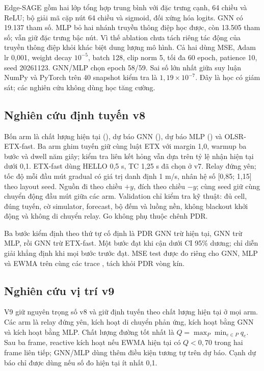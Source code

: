 Edge-SAGE gồm hai lớp tổng hợp trung bình với đặc trưng cạnh, 64 chiều và
ReLU; bộ giải mã cặp nút 64 chiều và sigmoid, đối xứng hóa logits. GNN có
19.137 tham số. MLP bỏ hai nhánh truyền thông điệp học được, còn 13.505 tham
số; vẫn giữ đặc trưng bậc nút. Vì thế ablation chưa tách riêng tác động của
truyền thông điệp khỏi khác biệt dung lượng mô hình. Cả hai dùng MSE, Adam
lr 0,001, weight decay $10^{-5}$, batch 128, clip norm 5, tối đa 60 epoch,
patience 10, seed 20261123. GNN/MLP chọn epoch 58/59. Sai số lớn nhất giữa
suy luận NumPy và PyTorch trên 40 snapshot kiểm tra là $1{,}19\times10^{-7}$.
Đây là học có giám sát; các nghiên cứu không dùng học tăng cường.

\subsection{Nghiên cứu định tuyến v8}\label{sub:v8}
Bốn arm là chất lượng hiện tại (), dự báo GNN
(), dự báo MLP () và OLSR-ETX-fast.
Ba arm ghim tuyến giữ cùng luật ETX với margin 1,0, warmup ba bước và dwell
năm giây; kiểm tra liên kết hỏng vẫn dựa trên tỷ lệ nhận hiện tại dưới 0,1.
ETX-fast dùng HELLO 0,5 s, TC 1,25 s đã chọn ở v7. Relay đứng yên; tốc độ
mỗi đầu mút gradual có giá trị danh định 1 m/s, nhân hệ số [0,85; 1,15] theo
layout seed. Nguồn đi theo chiều $+y$, đích theo chiều $-y$; cùng seed giữ
cùng chuyển động đầu mút giữa các arm. Validation chỉ kiểm tra kỹ thuật: đủ cell,
đúng tuyến, cờ simulator, forecast, bộ đếm và luồng nền, không blackout khởi
động và không di chuyển relay. Go không phụ thuộc chênh PDR.

Ba bước kiểm định theo thứ tự cố định là PDR GNN trừ hiện tại, GNN trừ MLP,
rồi GNN trừ ETX-fast. Một bước đạt khi cận dưới CI 95\% dương; chỉ diễn giải
khẳng định khi mọi bước trước đạt. MSE test được đo riêng cho GNN, MLP và
EWMA trên cùng các trace , tách khỏi PDR vòng kín.

\subsection{Nghiên cứu vị trí v9}
V9 giữ nguyên trọng số v8 và giữ định tuyến theo chất lượng hiện tại ở mọi
arm. Các arm là relay đứng yên, kích hoạt di chuyển phản ứng, kích hoạt bằng
GNN và kích hoạt bằng MLP. Chất lượng đường tốt nhất là $Q=\max_P\min_{e\in P}q_e$.
Sau ba frame, reactive kích hoạt nếu EWMA hiện tại có $Q<0{,}70$ trong hai
frame liên tiếp; GNN/MLP dùng thêm điều kiện tương tự trên dự báo. Cạnh dự
báo chỉ được dùng nếu số đo hiện tại ít nhất 0,1.

